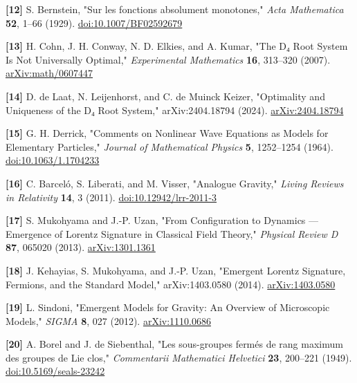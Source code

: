 \documentclass[a4paper,11pt]{article}
\begin{document}
\label{ref12}
\noindent \textbf{[12]} S. Bernstein, "Sur les fonctions absolument monotones," \textit{Acta Mathematica} \textbf{52}, 1–66 (1929). \href{https://doi.org/10.1007/BF02592679}{doi:10.1007/BF02592679}


\label{ref13}
\noindent \textbf{[13]} H. Cohn, J. H. Conway, N. D. Elkies, and A. Kumar, "The D₄ Root System Is Not Universally Optimal," \textit{Experimental Mathematics} \textbf{16}, 313–320 (2007). \href{https://arxiv.org/abs/math/0607447}{arXiv:math/0607447}


\label{ref14}
\noindent \textbf{[14]} D. de Laat, N. Leijenhorst, and C. de Muinck Keizer, "Optimality and Uniqueness of the D₄ Root System," arXiv:2404.18794 (2024). \href{https://arxiv.org/abs/2404.18794}{arXiv:2404.18794}


\label{ref15}
\noindent \textbf{[15]} G. H. Derrick, "Comments on Nonlinear Wave Equations as Models for Elementary Particles," \textit{Journal of Mathematical Physics} \textbf{5}, 1252–1254 (1964). \href{https://doi.org/10.1063/1.1704233}{doi:10.1063/1.1704233}


\label{ref16}
\noindent \textbf{[16]} C. Barceló, S. Liberati, and M. Visser, "Analogue Gravity," \textit{Living Reviews in Relativity} \textbf{14}, 3 (2011). \href{https://doi.org/10.12942/lrr-2011-3}{doi:10.12942/lrr-2011-3}


\label{ref17}
\noindent \textbf{[17]} S. Mukohyama and J.-P. Uzan, "From Configuration to Dynamics — Emergence of Lorentz Signature in Classical Field Theory," \textit{Physical Review D} \textbf{87}, 065020 (2013). \href{https://arxiv.org/abs/1301.1361}{arXiv:1301.1361}


\label{ref18}
\noindent \textbf{[18]} J. Kehayias, S. Mukohyama, and J.-P. Uzan, "Emergent Lorentz Signature, Fermions, and the Standard Model," arXiv:1403.0580 (2014). \href{https://arxiv.org/abs/1403.0580}{arXiv:1403.0580}


\label{ref19}
\noindent \textbf{[19]} L. Sindoni, "Emergent Models for Gravity: An Overview of Microscopic Models," \textit{SIGMA} \textbf{8}, 027 (2012). \href{https://arxiv.org/abs/1110.0686}{arXiv:1110.0686}


\label{ref20}
\noindent \textbf{[20]} A. Borel and J. de Siebenthal, "Les sous-groupes fermés de rang maximum des groupes de Lie clos," \textit{Commentarii Mathematici Helvetici} \textbf{23}, 200–221 (1949). \href{https://doi.org/10.5169/seals-23242}{doi:10.5169/seals-23242}
\end{document}
